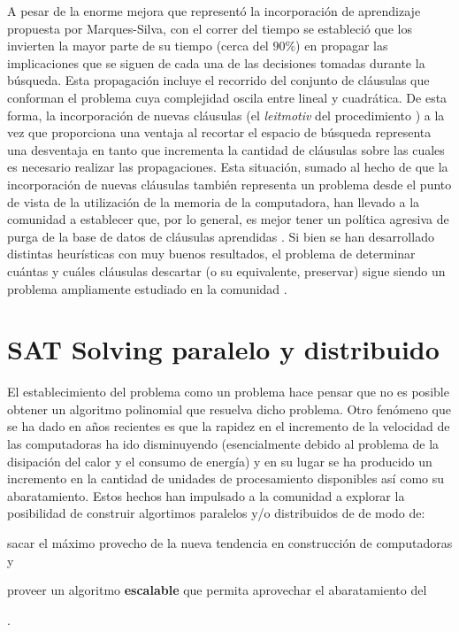 A pesar de la enorme mejora que representó la incorporación de aprendizaje propuesta
por Marques-Silva, con el correr del tiempo se estableció que los \ssolvers
invierten la mayor parte de su tiempo (cerca del $90\%$) en propagar las
implicaciones que se siguen de cada una de las decisiones tomadas durante la
búsqueda. Esta propagación incluye el recorrido del conjunto de cláusulas que conforman el problema cuya complejidad oscila entre lineal y cuadrática. De esta forma, la incorporación de nuevas cláusulas (el \emph{leitmotiv} del procedimiento
\CDCL) a la vez que proporciona una ventaja al recortar el espacio de búsqueda
representa una desventaja en tanto que incrementa la cantidad de cláusulas
sobre las cuales es necesario realizar las propagaciones. Esta situación,
sumado al hecho de que la incorporación de nuevas cláusulas también representa
un problema desde el punto de vista de la utilización de la memoria de la
computadora, han llevado a la comunidad a establecer que, por lo general, es
mejor tener un política agresiva de purga de la base de datos de cláusulas
aprendidas \cite{Audemard:2009:PLC:1661445.1661509}. Si bien se han
desarrollado distintas heurísticas con muy buenos resultados, el problema de
determinar cuántas y cuáles cláusulas descartar (o su equivalente, preservar)
sigue siendo un problema ampliamente estudiado en la comunidad \sat.


\section{SAT Solving paralelo y distribuido}

El establecimiento del problema \sat como un problema \npc hace pensar que no
es posible obtener un algoritmo polinomial que resuelva dicho problema. Otro fenómeno que se ha dado en años recientes es que la rapidez en el incremento de la velocidad de las
computadoras ha ido disminuyendo (esencialmente debido al problema de la
disipación del calor y el consumo de energía)  y en su lugar se ha producido un
incremento en la cantidad de unidades de procesamiento disponibles así como su
abaratamiento. Estos hechos han impulsado a la comunidad \sat a explorar la
posibilidad de construir algortimos paralelos y/o distribuidos de \ssolving de
modo de: 
\begin{inparaenum}[a)] 
\item sacar el máximo provecho de la nueva tendencia en construcción de computadoras y 
\item proveer un algoritmo \textbf{escalable} que permita aprovechar el abaratamiento del \hard
\end{inparaenum}.

